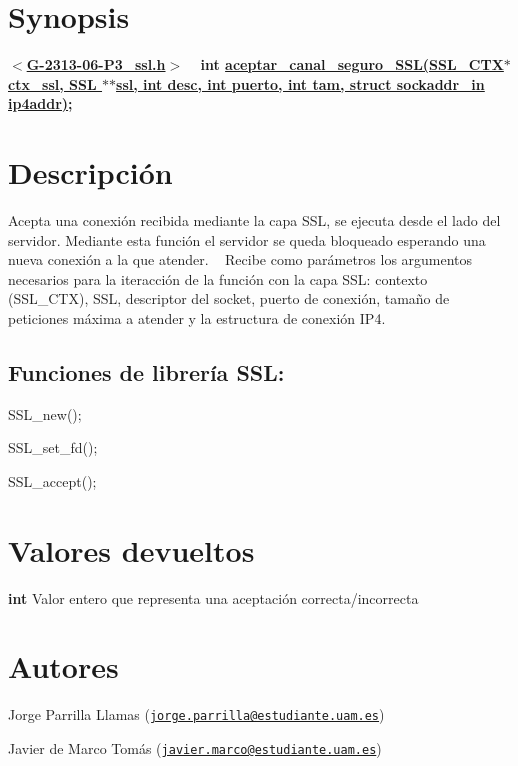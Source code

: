 \hypertarget{aceptar_canal_seguro_SSL_synopsis_2}{}\section{Synopsis}\label{aceptar_canal_seguro_SSL_synopsis_2}
{ {\bfseries $<$\hyperlink{G-2313-06-P3__ssl_8h}{G-\/2313-\/06-\/\+P3\+\_\+ssl.\+h}$>$} ~\newline
 {\bfseries int \hyperlink{G-2313-06-P3__ssl_8c_a44410967ff9e0a1b4219c85f0e62e926}{aceptar\+\_\+canal\+\_\+seguro\+\_\+\+S\+S\+L(\+S\+S\+L\+\_\+\+C\+T\+X$\ast$ ctx\+\_\+ssl, S\+S\+L $\ast$$\ast$ssl, int desc, int puerto, int tam, struct sockaddr\+\_\+in ip4addr)};} } \hypertarget{aceptar_canal_seguro_SSL_descripcion_2}{}\section{Descripción}\label{aceptar_canal_seguro_SSL_descripcion_2}
Acepta una conexión recibida mediante la capa S\+SL, se ejecuta desde el lado del servidor. Mediante esta función el servidor se queda bloqueado esperando una nueva conexión a la que atender. ~\newline
Recibe como parámetros los argumentos necesarios para la iteracción de la función con la capa S\+SL\+: contexto (S\+S\+L\+\_\+\+C\+TX), S\+SL, descriptor del socket, puerto de conexión, tamaño de peticiones máxima a atender y la estructura de conexión I\+P4. ~\newline
\subsection*{{\bfseries Funciones de librería S\+SL\+:}}


\begin{DoxyItemize}
\item S\+S\+L\+\_\+new(); 
\item S\+S\+L\+\_\+set\+\_\+fd(); 
\item S\+S\+L\+\_\+accept(); 
\end{DoxyItemize}\hypertarget{aceptar_canal_seguro_SSL_return_2}{}\section{Valores devueltos}\label{aceptar_canal_seguro_SSL_return_2}

\begin{DoxyItemize}
\item {\bfseries int} Valor entero que representa una aceptación correcta/incorrecta 
\end{DoxyItemize}\hypertarget{aceptar_canal_seguro_SSL_authors_2}{}\section{Autores}\label{aceptar_canal_seguro_SSL_authors_2}

\begin{DoxyItemize}
\item Jorge Parrilla Llamas (\href{mailto:jorge.parrilla@estudiante.uam.es}{\tt jorge.\+parrilla@estudiante.\+uam.\+es}) 
\item Javier de Marco Tomás (\href{mailto:javier.marco@estudiante.uam.es}{\tt javier.\+marco@estudiante.\+uam.\+es}) 
\end{DoxyItemize}